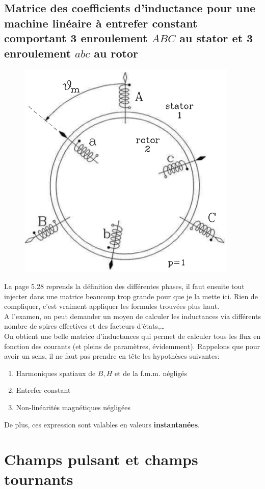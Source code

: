 	\subsection{Matrice des coefficients d'inductance pour une machine linéaire à 
	entrefer constant comportant 3 enroulement $ABC$ au stator et 3 enroulement 
	$abc$ au rotor}
	\begin{figure}
	\vspace{-8mm}
	\includegraphics[scale=0.3]{ch5/image15.png}
	\end{figure}
	La page 5.28 reprends la définition des différentes phases, il faut ensuite 
	tout injecter dans une matrice beaucoup trop grande pour que je la  mette ici. 
	Rien de compliquer, c'est vraiment appliquer les formules trouvées plus haut.\\
	
	A l'examen, on peut demander un moyen de calculer les inductances via différents 
	nombre de spires effectives et des facteurs d'états,\dots\\
	
	On obtient une belle matrice d'inductances qui permet de calculer tous les flux 
	en fonction des courants (et pleins de paramètres, évidemment). Rappelons que 
	pour avoir un sens, il ne faut pas prendre en tête les  hypothèses suivantes:
	\begin{enumerate}
	\item Harmoniques spatiaux de $B,H$ et de la f.m.m. négligés
	\item Entrefer constant
	\item Non-linéarités magnétiques négligées
	\end{enumerate}
	De plus, ces expression sont valables en valeurs \textbf{instantanées}.
	
	
	\newpage
\section{Champs pulsant et champs tournants}
	
	
	
	
	
	
	
	
	
	
	